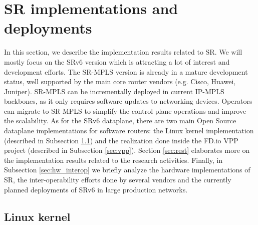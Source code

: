 \section{SR implementations and deployments}
\label{sec:tools}

\begin{comment}

\begin{itemize}
    \item VPP implementation of SR
    \item Other open source implementations from the works listed in Research Directions (if the tools are open source and are valuable)
    \item Other implementations from vendors
\end{itemize}

\end{comment}

In this section, we describe the implementation results related to SR. We will mostly focus on the SRv6 version which is attracting a lot of interest and development efforts. The SR-MPLS version is already in a mature development status, well supported by the main core router vendors (e.g. Cisco, Huawei, Juniper). SR-MPLS can be incrementally deployed in current IP-MPLS backbones, as it only requires software updates to networking devices. Operators can migrate to SR-MPLS to simplify the control plane operations and improve the scalability. As for the SRv6 dataplane, there are two main Open Source dataplane implementations for software routers: the Linux kernel implementation (described in Subsection \ref{sec:linux}) and the realization done inside the FD.io VPP project (described in Subsection \ref{sec:vpp}).  Section \ref{sec:rest} elaborates more on the implementation results related to the research activities. Finally, in Subsection \ref{sec:hw_interop} we briefly analyze the hardware implementations of SR, the inter-operability efforts done by several vendors and the currently planned deployments of SRv6 in large production networks.

\subsection{Linux kernel}
\label{sec:linux}

